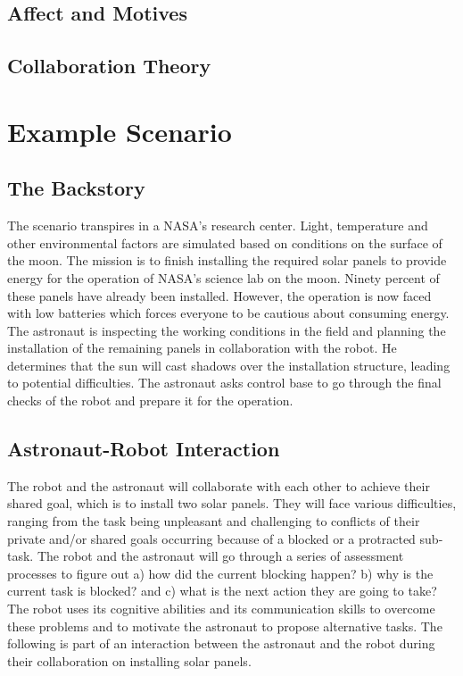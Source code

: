 \subsection{Affect and Motives}

\subsection{Collaboration Theory}
\label{sec:collaboration-theory}

\section{Example Scenario}
\label{sec:example-scenario}

\subsection{The Backstory}

The scenario transpires in a NASA's research center. Light, temperature and
other environmental factors are simulated based on conditions on the surface of
the moon. The mission is to finish installing the required solar panels to
provide energy for the operation of NASA's science lab on the moon. Ninety
percent of these panels have already been installed. However, the operation is
now faced with low batteries which forces everyone to be cautious about
consuming energy. The astronaut is inspecting the working conditions in the
field and planning the installation of the remaining panels in collaboration
with the robot. He determines that the sun will cast shadows over the
installation structure, leading to potential difficulties. The astronaut asks
control base to go through the final checks of the robot and prepare it for the
operation.

\subsection{Astronaut-Robot Interaction}

The robot and the astronaut will collaborate with each other to achieve their
shared goal, which is to install two solar panels. They will face various
difficulties, ranging from the task being unpleasant and challenging to
conflicts of their private and/or shared goals occurring because of a blocked or
a protracted sub-task. The robot and the astronaut will go through a series of
assessment processes to figure out a) how did the current blocking happen? b)
why is the current task is blocked? and c) what is the next action they are
going to take? The robot uses its cognitive abilities and its communication
skills to overcome these problems and to motivate the astronaut to propose
alternative tasks. The following is part of an interaction between the astronaut
and the robot during their collaboration on installing solar panels.

